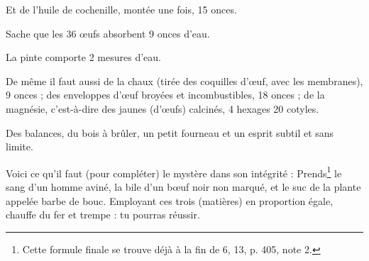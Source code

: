 \documentclass[a4paper, 11pt, oneside, polutonikogreek, french]{article}
\begin{document}
Et de l'huile de cochenille, montée une fois, 15 onces.

Sache que les 36 œufs absorbent 9 onces d'eau.

La pinte comporte 2 mesures d'eau.

De même il faut aussi de la chaux (tirée des coquilles d'œuf, avec les membranes), 9 onces ; des enveloppes d'œuf broyées et incombustibles, 18 onces ; de la magnésie, c'est-à-dire des jaunes (d'œufs) calcinés, 4 hexages 20 cotyles.

Des balances, du bois à brûler, un petit fourneau et un esprit subtil et sans limite.

Voici ce qu'il faut (pour compléter) le mystère dans son intégrité : Prends\footnote{Cette formule finale se trouve déjà à la fin de 6, 13, p. 405, note 2.} le sang d'un homme aviné, la bile d'un bœuf noir non marqué, et le suc de la plante appelée barbe de bouc. Employant ces trois (matières) en proportion égale, chauffe du fer et trempe : tu pourras réussir.

\bigskip
\centerline{\EightStarTaper}
\centerline{\EightStarTaper\EightStarTaper}
\bigskip
\end{document}
